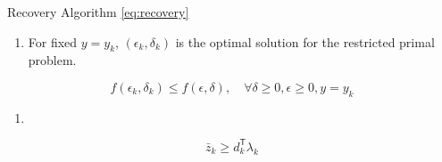 \documentclass[../main]{subfiles}
\begin{document}
\begin{theorem} \label{lemma:recovery}  Recovery Algorithm \eqref{eq:recovery}
  \begin{enumerate}
    \def\labelenumi{(\alph{enumi})}

    \item
          For fixed \(y=y_k\), \((\epsilon_k, \delta_k)\) is the optimal
          solution for the restricted primal problem.
  \end{enumerate}

  \[f(\epsilon_k, \delta_k) \le f(\epsilon, \delta), \quad \forall \delta\ge 0, \epsilon\ge 0, y= y_k\]



  \begin{enumerate}
    \def\labelenumi{(\alph{enumi})}
    \setcounter{enumi}{1}

    \item
  \end{enumerate}
  \[\bar z_k \ge d_k^\mathsf{T} \lambda_k\]

\end{theorem}
\end{document}
